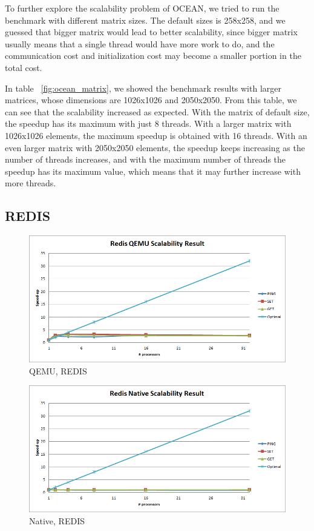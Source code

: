 To further explore the scalability problem of OCEAN, we tried to run the 
benchmark with different matrix sizes. The default sizes is 258x258, and we
guessed that bigger matrix would lead to better scalability, since bigger
matrix usually means that a single thread would have more work to do, and the
communication cost and initialization cost may become a smaller portion in
the total cost. 

In table ~\ref{fig:ocean_matrix}, we showed the benchmark
results with larger matrices, whose dimensions are 1026x1026 and 2050x2050.
From this table, we can see that the scalability increased as expected.
With the matrix of default size, the speedup has its maximum with just 
8 threads.  With a larger matrix with 1026x1026 elements, the maximum speedup
is obtained with 16 threads. With an even larger matrix with 2050x2050
elements, the speedup keeps increasing as the number of threads increases,
and with the maximum number of threads the speedup has its maximum value,
which means that it may further increase with more threads.

\subsection{REDIS}
\begin{figure}[H]
\center
\includegraphics[width=0.8\linewidth]{figures/redis_qemu.png}
\caption{QEMU, REDIS}
\label{fig:redis_vm}
\end{figure}

\begin{figure}[H]
\center
\includegraphics[width=0.8\linewidth]{figures/redis_native.png}
\caption{Native, REDIS}
\label{fig:redis_native}
\end{figure}


